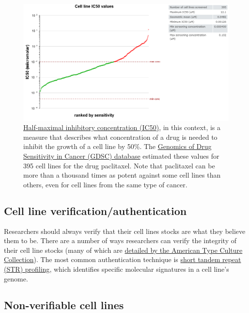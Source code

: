 \documentclass[letterpaper, 12pt]{article}
\begin{document}
\begin{figure}[h!tbp]
    \includegraphics[width=\textwidth]{img/cell_lines/Screenshot 2024-11-04 at 12-02-27 Drug Paclitaxel - Cancerrxgene - Genomics of Drug Sensitivity in Cancer.png}
    \caption*{\href{https://en.wikipedia.org/wiki/IC50}{Half-maximal inhibitory concentration (IC50)}, in this context, is a measure that describes what concentration of a drug is needed to inhibit the growth of a cell line by 50\%. The \href{https://www.cancerrxgene.org/compound/Paclitaxel/11/overview/ic50?tissue=PANCANCER&screening_set=GDSC1}{Genomics of Drug Sensitivity in Cancer (GDSC) database} estimated these values for 395 cell lines for the drug paclitaxel. Note that paclitaxel can be more than a thousand times as potent against some cell lines than others, even for cell lines from the same type of cancer.}
\end{figure}

\subsection*{Cell line verification/authentication}

Researchers should always verify that their cell lines stocks are what they believe them to be. There are a number of ways researchers can verify the integrity of their cell line stocks (many of which are \href{https://www.atcc.org/resources/technical-documents/cell-line-authentication-test-recommendations}{detailed by the American Type Culture Collection}). The most common authentication technique is \href{https://en.wikipedia.org/wiki/STR_analysis}{short tandem repeat (STR) profiling}, which identifies specific molecular signatures in a cell line's genome.

\subsection*{Non-verifiable cell lines}
\end{document}
